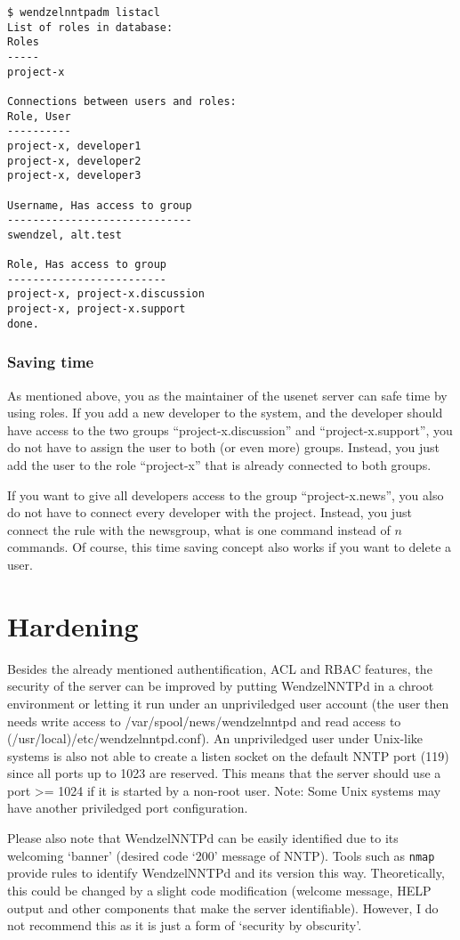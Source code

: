 \begin{verbatim}
$ wendzelnntpadm listacl
List of roles in database:
Roles
-----
project-x

Connections between users and roles:
Role, User
----------
project-x, developer1
project-x, developer2
project-x, developer3

Username, Has access to group
-----------------------------
swendzel, alt.test

Role, Has access to group
-------------------------
project-x, project-x.discussion
project-x, project-x.support
done.
\end{verbatim}

\subsubsection{Saving time}

As mentioned above, you as the maintainer of the usenet server can safe time by using roles. If you add a new developer to the system, and the developer should have access to the two groups ``project-x.discussion'' and ``project-x.support'', you do not have to assign the user to both (or even more) groups. Instead, you just add the user to the role ``project-x'' that is already connected to both groups.

If you want to give all developers access to the group ``project-x.news'', you also do not have to connect every developer with the project. Instead, you just connect the rule with the newsgroup, what is one command instead of $n$ commands. Of course, this time saving concept also works if you want to delete a user.

\section{Hardening}

Besides the already mentioned authentification, ACL and RBAC features, the security of the server can be improved by putting WendzelNNTPd in a chroot environment or letting it run under an unpriviledged user account (the user then needs write access to /var/spool/news/wendzelnntpd and read access to (/usr/local)/etc/wendzelnntpd.conf). An unpriviledged user under Unix-like systems is also not able to create a listen socket on the default NNTP port (119) since all ports up to 1023 are reserved. This means that the server should use a port >= 1024 if it is started by a non-root user. Note: Some Unix systems may have another priviledged port configuration. 

Please also note that WendzelNNTPd can be easily identified due to its welcoming `banner' (desired code `200' message of NNTP). Tools such as \texttt{nmap} provide rules to identify WendzelNNTPd and its version this way. Theoretically, this could be changed by a slight code modification (welcome message, HELP output and other components that make the server identifiable). However, I do not recommend this as it is just a form of `security by obscurity'.

